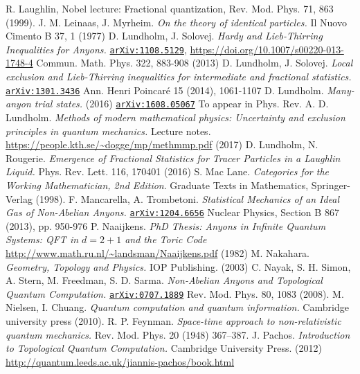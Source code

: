 \begin{thebibliography}{99}
 R. Laughlin, Nobel lecture: Fractional quantization, Rev. Mod. Phys. 71, 863 (1999).
 J. M. Leinaas, J. Myrheim. \textit{On the theory of identical particles.} Il Nuovo Cimento B 37, 1 (1977)
 D. Lundholm, J. Solovej. \textit{Hardy and Lieb-Thirring Inequalities for Anyons.} \href{https://arxiv.org/abs/1108.5129}{\texttt{arXiv:1108.5129}}, \url{https://doi.org/10.1007/s00220-013-1748-4} Commun. Math. Phys. 322, 883-908 (2013)
 D. Lundholm, J. Solovej. \textit{Local exclusion and Lieb-Thirring inequalities for intermediate and fractional statistics.} \href{https://arxiv.org/abs/1301.3436}{\texttt{arXiv:1301.3436}} Ann. Henri Poincaré 15 (2014), 1061-1107
 D. Lundholm. \textit{Many-anyon trial states.} (2016) \href{https://arxiv.org/abs/1608.05067}{\texttt{arXiv:1608.05067}} To appear in Phys. Rev. A.
 D. Lundholm. \textit{Methods of modern mathematical physics: Uncertainty and exclusion principles in quantum mechanics.} Lecture notes. \url{https://people.kth.se/~dogge/mp/methmmp.pdf} (2017)
 D. Lundholm, N. Rougerie. \textit{Emergence of Fractional Statistics for Tracer Particles in a Laughlin Liquid.} Phys. Rev. Lett. 116, 170401 (2016)
 S. Mac Lane. \textit{Categories for the Working Mathematician, 2nd Edition}. Graduate Texts in Mathematics, Springer-Verlag (1998).
 F. Mancarella, A. Trombetoni. \textit{Statistical Mechanics of an Ideal Gas of Non-Abelian Anyons.} \href{https://arxiv.org/abs/1204.6656}{\texttt{arXiv:1204.6656}} Nuclear Physics, Section B 867 (2013), pp. 950-976
 P. Naaijkens. \textit{PhD Thesis: Anyons in Infinite Quantum Systems: QFT in $d=2+1$ and the Toric Code} \url{http://www.math.ru.nl/~landsman/Naaijkens.pdf} (1982) %
 M. Nakahara. \textit{Geometry, Topology and Physics.} IOP Publishing. (2003)
 C. Nayak, S. H. Simon, A. Stern, M. Freedman, S. D. Sarma. \textit{Non-Abelian Anyons and Topological Quantum Computation.} \href{https://arxiv.org/pdf/0707.1889.pdf}{\texttt{arXiv:0707.1889}} Rev. Mod. Phys. 80, 1083 (2008).
 M. Nielsen, I. Chuang. \textit{Quantum computation and quantum information.} Cambridge university press (2010).
 R. P. Feynman. \textit{Space-time approach to non-relativistic quantum mechanics.} Rev. Mod. Phys. 20 (1948) 367–387.
 J. Pachos. \textit{Introduction to Topological Quantum Computation.} Cambridge University Press. (2012) \\ \url{http://quantum.leeds.ac.uk/jiannis-pachos/book.html}%

\end{thebibliography}
